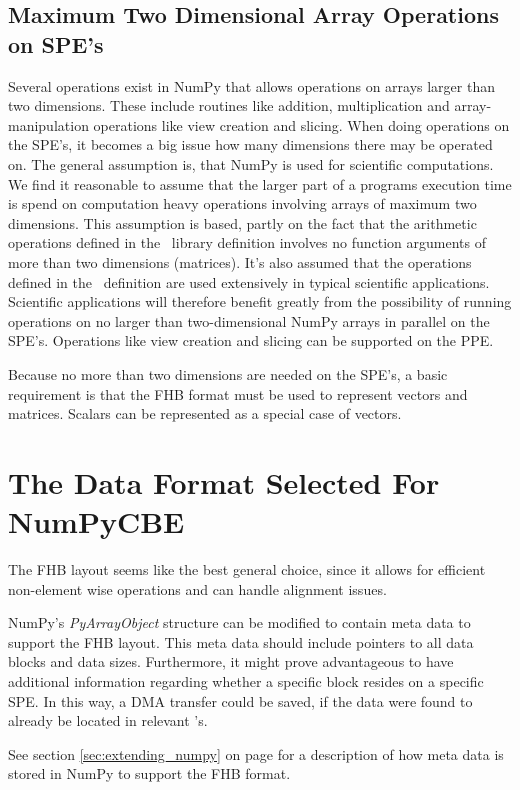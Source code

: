\subsection{Maximum Two Dimensional Array Operations on SPE's}

Several operations exist in NumPy that allows operations on arrays
larger than two dimensions. These include routines like addition,
multiplication and array-manipulation operations like view creation
and slicing. When doing operations on the SPE's, it becomes a big
issue how many dimensions there may be operated on. The general
assumption is, that NumPy is used for scientific computations. We find
it reasonable to assume that the larger part of a programs execution
time is spend on computation heavy operations involving arrays of
maximum two dimensions. This assumption is based, partly on the fact
that the arithmetic operations defined in the \BLAS\ library definition
involves no function arguments of more than two dimensions
(matrices). It's also assumed that the operations defined in the \BLAS\
definition are used extensively in typical scientific
applications. Scientific applications will therefore benefit greatly
from the possibility of running operations on no larger than
two-dimensional NumPy arrays in parallel on the SPE's. Operations like
view creation and slicing can be supported on the PPE.

Because no more than two dimensions are needed on the SPE's, a basic
requirement is that the FHB format must be used to represent vectors
and matrices. Scalars can be represented as a special case of vectors.

\section{The Data Format Selected For NumPyCBE}

The FHB layout seems like the best general choice, since it allows for
efficient non-element wise operations and can handle alignment issues.

NumPy's \emph{PyArrayObject} structure can be modified to contain meta
data to support the FHB layout. This meta data should include
pointers to all data blocks and data sizes. Furthermore, it might
prove advantageous to have additional information regarding whether a
specific block resides on a specific SPE. In this way, a DMA transfer
could be saved, if the data were found to already be located in
relevant \LS{}'s.

See section \ref{sec:extending_numpy} on
page \pageref{sec:extending_numpy} for a description of how meta data
is stored in NumPy to support the FHB format.


